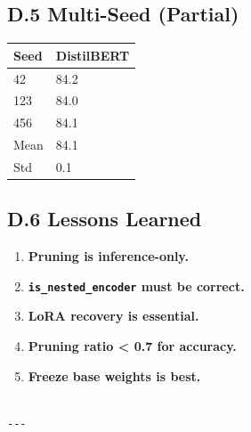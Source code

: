 \subsection{D.5 Multi-Seed (Partial)}

\begin{table}[H]
\centering
\small
\begin{tabular}{ll}
\toprule
\textbf{Seed} & \textbf{DistilBERT} \\
\midrule
42 & 84.2 \\
123 & 84.0 \\
456 & 84.1 \\
Mean & 84.1 \\
Std & 0.1 \\
\bottomrule
\end{tabular}
\end{table}

\subsection{D.6 Lessons Learned}

\begin{enumerate}
\item \textbf{Pruning is inference-only.}
\item \textbf{\texttt{is\_nested\_encoder} must be correct.}
\item \textbf{LoRA recovery is essential.}
\item \textbf{Pruning ratio \textless{} 0.7 for accuracy.}
\item \textbf{Freeze base weights is best.}
\end{enumerate}
\begin{lstlisting}

---
\end{lstlisting}